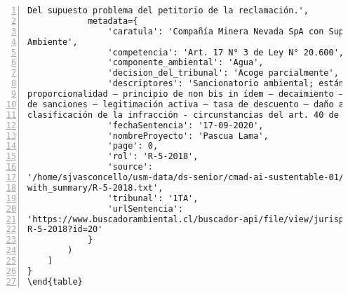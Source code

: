 \begin{Verbatim}[frame=lines, label=Elavoración propia -  Ejemplo de Contexto enviado por el Chatbot a OpenAI
				, fontsize=\scriptsize, numbers=left
				, baselinestretch=0.4
				, formatcom=\color{gray}]
Del supuesto problema del petitorio de la reclamación.',
            metadata={
                'caratula': 'Compañía Minera Nevada SpA con Superintendencia del Medio
Ambiente',
                'competencia': 'Art. 17 N° 3 de Ley N° 20.600',
                'componente_ambiental': 'Agua',
                'decision_del_tribunal': 'Acoge parcialmente',
                'descriptores': 'Sancionatorio ambiental; estándar de motivación –
proporcionalidad – principio de non bis in ídem – decaimiento – metodología de determinación
de sanciones – legitimación activa – tasa de descuento – daño ambiental – impacto ambiental –
clasificación de la infracción - circunstancias del art. 40 de la Ley N° 20.417',
                'fechaSentencia': '17-09-2020',
                'nombreProyecto': 'Pascua Lama',
                'page': 0,
                'rol': 'R-5-2018',
                'source':
'/home/sjvasconcello/usm-data/ds-senior/cmad-ai-sustentable-01/etl/load/../../data/clean/docs_
with_summary/R-5-2018.txt',
                'tribunal': '1TA',
                'urlSentencia':
'https://www.buscadorambiental.cl/buscador-api/file/view/jurisprudencia/S1TA Rol N°
R-5-2018?id=20'
            }
        )
    ]
}
\end{table}
\end{Verbatim}


